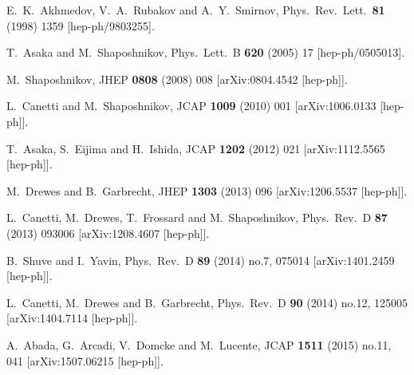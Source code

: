 \documentclass[prd,twocolumn,superscriptaddress,preprintnumbers,nofootinbib,
noshowpacs,groupedaddress]{revtex4-1} %
\begin{document}
\begin{thebibliography}{99}

  E.~K.~Akhmedov, V.~A.~Rubakov and A.~Y.~Smirnov,
  Phys.\ Rev.\ Lett.\  {\bf 81} (1998) 1359
  [hep-ph/9803255].
  
  T.~Asaka and M.~Shaposhnikov,
  Phys.\ Lett.\ B {\bf 620} (2005) 17
  [hep-ph/0505013].
  
  M.~Shaposhnikov,
  JHEP {\bf 0808} (2008) 008
  [arXiv:0804.4542 [hep-ph]].
  
  L.~Canetti and M.~Shaposhnikov,
  JCAP {\bf 1009} (2010) 001
  [arXiv:1006.0133 [hep-ph]].
  
  T.~Asaka, S.~Eijima and H.~Ishida,
  JCAP {\bf 1202} (2012) 021
  [arXiv:1112.5565 [hep-ph]].  
  
  M.~Drewes and B.~Garbrecht,
  JHEP {\bf 1303} (2013) 096
  [arXiv:1206.5537 [hep-ph]].
  
  L.~Canetti, M.~Drewes, T.~Frossard and M.~Shaposhnikov,
  Phys.\ Rev.\ D {\bf 87} (2013) 093006
  [arXiv:1208.4607 [hep-ph]].
  
  B.~Shuve and I.~Yavin,
  Phys.\ Rev.\ D {\bf 89} (2014) no.7,  075014
  [arXiv:1401.2459 [hep-ph]].  

  L.~Canetti, M.~Drewes and B.~Garbrecht,
  Phys.\ Rev.\ D {\bf 90} (2014) no.12,  125005
  [arXiv:1404.7114 [hep-ph]].
  
  A.~Abada, G.~Arcadi, V.~Domcke and M.~Lucente,
  JCAP {\bf 1511} (2015) no.11,  041
  [arXiv:1507.06215 [hep-ph]].


\end{thebibliography}
\end{document}

